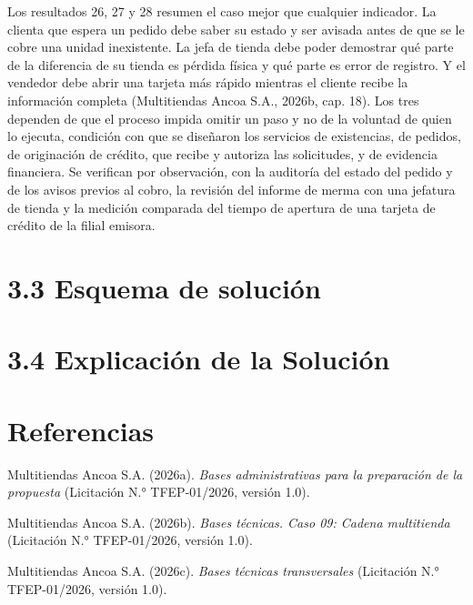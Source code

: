 \documentclass[11pt]{article}
\begin{document}
Los resultados 26, 27 y 28 resumen el caso mejor que cualquier indicador. La clienta que espera un pedido debe saber su estado y ser avisada antes de que se le cobre una unidad inexistente. La jefa de tienda debe poder demostrar qué parte de la diferencia de su tienda es pérdida física y qué parte es error de registro. Y el vendedor debe abrir una tarjeta más rápido mientras el cliente recibe la información completa (Multitiendas Ancoa S.A., 2026b, cap. 18). Los tres dependen de que el proceso impida omitir un paso y no de la voluntad de quien lo ejecuta, condición con que se diseñaron los servicios de existencias, de pedidos, de originación de crédito, que recibe y autoriza las solicitudes, y de evidencia financiera. Se verifican por observación, con la auditoría del estado del pedido y de los avisos previos al cobro, la revisión del informe de merma con una jefatura de tienda y la medición comparada del tiempo de apertura de una tarjeta de crédito de la filial emisora.


\section{3.3 Esquema de solución}

\section{3.4 Explicación de la Solución}

\section*{Referencias}

Multitiendas Ancoa S.A. (2026a). \textit{Bases administrativas para la preparación de la propuesta} (Licitación N.° TFEP-01/2026, versión 1.0).

Multitiendas Ancoa S.A. (2026b). \textit{Bases técnicas. Caso 09: Cadena multitienda} (Licitación N.° TFEP-01/2026, versión 1.0).

Multitiendas Ancoa S.A. (2026c). \textit{Bases técnicas transversales} (Licitación N.° TFEP-01/2026, versión 1.0).
\end{document}

